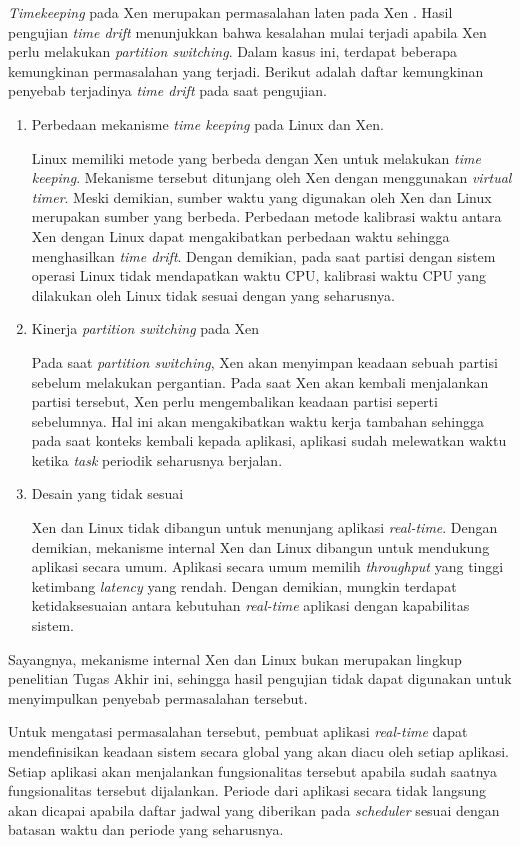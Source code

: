 \textit{Timekeeping} pada Xen merupakan permasalahan laten pada Xen \citep{Adamczyk2015}
\citep{Broomhead2010}. Hasil pengujian \textit{time drift} menunjukkan bahwa kesalahan mulai
terjadi apabila Xen perlu melakukan \textit{partition switching}. Dalam kasus ini, terdapat
beberapa kemungkinan permasalahan yang terjadi. Berikut adalah daftar kemungkinan penyebab
terjadinya \textit{time drift} pada saat pengujian.
\begin{enumerate}

	\item Perbedaan mekanisme \textit{time keeping} pada Linux dan Xen.

		Linux memiliki metode yang berbeda dengan Xen untuk melakukan \textit{time
		keeping}. Mekanisme tersebut ditunjang oleh Xen dengan menggunakan
		\textit{virtual timer}. Meski demikian, sumber waktu yang digunakan oleh Xen dan
		Linux merupakan sumber yang berbeda. Perbedaan metode kalibrasi waktu antara Xen
		dengan Linux dapat mengakibatkan perbedaan waktu sehingga menghasilkan
		\textit{time drift}. Dengan demikian, pada saat partisi dengan sistem operasi
		Linux tidak mendapatkan waktu CPU, kalibrasi waktu CPU yang dilakukan oleh Linux
		tidak sesuai dengan yang seharusnya.

	\item Kinerja \textit{partition switching} pada Xen

		Pada saat \textit{partition switching}, Xen akan menyimpan keadaan sebuah
		partisi sebelum melakukan pergantian. Pada saat Xen akan kembali menjalankan
		partisi tersebut, Xen perlu mengembalikan keadaan partisi seperti sebelumnya.
		Hal ini akan mengakibatkan waktu kerja tambahan sehingga pada saat konteks
		kembali kepada aplikasi, aplikasi sudah melewatkan waktu ketika \textit{task}
		periodik seharusnya berjalan.

	\item Desain yang tidak sesuai

		Xen dan Linux tidak dibangun untuk menunjang aplikasi \textit{real-time}. Dengan
		demikian, mekanisme internal Xen dan Linux dibangun untuk mendukung aplikasi
		secara umum. Aplikasi secara umum memilih \textit{throughput} yang tinggi
		ketimbang \textit{latency} yang rendah. Dengan demikian, mungkin terdapat
		ketidaksesuaian antara kebutuhan \textit{real-time} aplikasi dengan kapabilitas
		sistem.

\end{enumerate}
Sayangnya, mekanisme internal Xen dan Linux bukan merupakan lingkup penelitian Tugas Akhir ini,
sehingga hasil pengujian tidak dapat digunakan untuk menyimpulkan penyebab permasalahan
tersebut.

Untuk mengatasi permasalahan tersebut, pembuat aplikasi \textit{real-time} dapat mendefinisikan
keadaan sistem secara global yang akan diacu oleh setiap aplikasi. Setiap aplikasi akan
menjalankan fungsionalitas tersebut apabila sudah saatnya fungsionalitas tersebut dijalankan.
Periode dari aplikasi secara tidak langsung akan dicapai apabila daftar jadwal yang diberikan
pada \textit{scheduler} sesuai dengan batasan waktu dan periode yang seharusnya.

